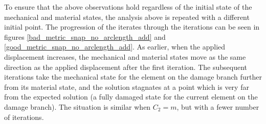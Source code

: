 \documentclass[11pt]{elsarticle}
\begin{document}
To ensure that the above observations hold regardless of the initial state of the mechanical and material states, the analysis above is repeated with a different initial point. The progression of the iterates through the iterations can be seen in figures \ref{bad_metric_snap_no_arclength_add} and \ref{good_metric_snap_no_arclength_add}. As earlier, when the applied displacement increases, the mechanical and material states move as the same direction as the applied displacement after the first iteration. The subsequent iterations take the mechanical state for the element on the damage branch further from its material state, and the solution stagnates at a point which is very far from the expected solution (a fully damaged state for the current element on the damage branch). The situation is similar when $C_2=m$, but with a fewer number of iterations.
\end{document}
